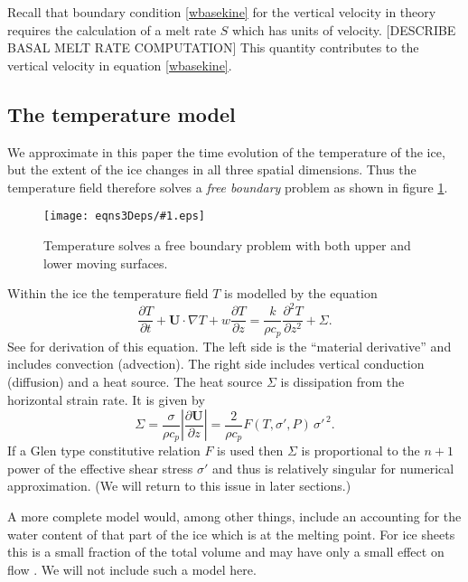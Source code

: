 \documentclass[12pt,final]{amsart}%
\theoremstyle{plain}
\theoremstyle{definition}
\theoremstyle{remark}
\newcommand{\regfigure}[2]{\texttt{[image: eqns3Deps/\#1.eps]}}
\newcommand{\ddt}[1]{\ensuremath{\frac{\partial #1}{\partial t}}}
\newcommand{\ddz}[1]{\ensuremath{\frac{\partial #1}{\partial z}}}
\newcommand{\dddzdz}[1]{\ensuremath{\frac{\partial^2 #1}{\partial z^2}}}
\newcommand{\grad}{\nabla}
\newcommand{\bU}{{\mathbf{U}}}
\begin{document}
Recall that boundary condition \eqref{wbasekine} for the vertical velocity in theory requires the calculation of a melt rate $S$ which has units of velocity.  [DESCRIBE BASAL MELT RATE COMPUTATION]
This quantity contributes to the vertical velocity in equation \eqref{wbasekine}.


\subsection*{The temperature model}\label{ss:temp}   We approximate in this paper the time evolution of the temperature of the ice, but the extent of the ice changes in all three spatial dimensions.  Thus the temperature field therefore solves a \emph{free boundary} problem as shown in figure \ref{tempbdry}.

\begin{figure}[ht]
\vspace{-3mm}
\regfigure{tempbdryfig}{3}
\vspace{-6mm}
\caption{Temperature solves a free boundary problem with both upper and lower moving surfaces.}
\label{tempbdry}
\end{figure}

Within the ice the temperature field $T$ is modelled by the equation
\begin{equation}\label{Teqn}
\ddt{T} + \bU\cdot \grad T + w \ddz{T} = \frac{k}{\rho c_p} \dddzdz{T}+ \Sigma.
\end{equation}
See \citep{Fowler,Paterson,vanderVeen} for derivation of this equation.  The left side is the ``material derivative'' and includes convection (advection).  The right side includes vertical conduction (diffusion) and a heat source.  The heat source $\Sigma$ is dissipation from the horizontal strain rate.  It is given by \citep{Paterson}
    $$\Sigma = \frac{\sigma}{\rho c_p} \left|\ddz{\bU}\right| = \frac{2}{\rho c_p} F(T,\sigma',P) \, \sigma'^{\,2}.$$
If a Glen type constitutive relation $F$ is used then $\Sigma$ is proportional to the $n+1$ power of the effective shear stress $\sigma'$ and thus is relatively singular for numerical approximation.   (We will return to this issue in later sections.)

A more complete model would, among other things,  include an accounting for the water content of that part of the ice which is at the melting point.  For ice sheets this is a small fraction of the total volume and may have only a small effect on flow \citep{Greve}.  We will not include such a model here.
\end{document}
